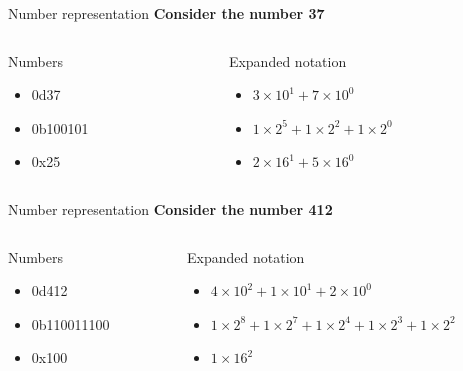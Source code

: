 \documentclass{beamer}
\begin{document}
\begin{frame}{Number representation}
\textbf{Consider the number \alert{37}} \\ \vspace{1cm}
\begin{columns}[T]
\begin{column}{0.5\textwidth}
\centering
Numbers \\
\hrulefill
\begin{itemize}
\item 0d37
\item 0b100101
\item 0x25
\end{itemize}
\end{column}
\begin{column}{0.5\textwidth}
\centering
Expanded notation \\
\hrulefill
\begin{itemize}
\item $3\times 10^1 + 7 \times 10^0$
\item $1\times 2^5 + 1 \times 2^2 + 1 \times 2^0$
\item $2\times 16^1 + 5 \times 16^0$
\end{itemize}
\end{column}
\end{columns}
\end{frame}

\begin{frame}{Number representation}
\textbf{Consider the number \alert{412}} \\ \vspace{1cm}
\begin{columns}[T]
\begin{column}{0.5\textwidth}
\centering
Numbers \\
\hrulefill
\begin{itemize}
\item 0d412
\item 0b110011100
\item 0x100
\end{itemize}
\end{column}
\begin{column}{0.5\textwidth}
\centering
Expanded notation \\
\hrulefill
\begin{itemize}
\item $4\times 10^2 + 1\times 10^1 + 2\times 10^0$
\item $1\times 2^8 + 1\times 2^7 + 1\times 2^4 + 1\times 2^3 + 1\times 2^2$
\item $1\times 16^2$
\end{itemize}
\end{column}
\end{columns}
\end{frame}
\end{document}
